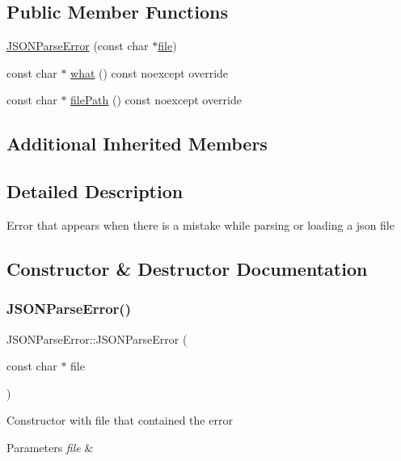 \subsection*{Public Member Functions}
\begin{DoxyCompactItemize}
\item 
\hyperlink{classJSONParseError_a92ab01ff5045faea98f10ed307b6306d}{J\+S\+O\+N\+Parse\+Error} (const char $\ast$\hyperlink{classFileError_a0ea1cc225bf7f8fa47aa0cfa0c2ba685}{file})
\item 
const char $\ast$ \hyperlink{classJSONParseError_a1f33b495974db21a050ede28eb0fe298}{what} () const noexcept override
\item 
const char $\ast$ \hyperlink{classJSONParseError_a24c5c1358b6ae6c96b30ebaa96e0a30b}{file\+Path} () const noexcept override
\end{DoxyCompactItemize}
\subsection*{Additional Inherited Members}


\subsection{Detailed Description}
Error that appears when there is a mistake while parsing or loading a json file 

\subsection{Constructor \& Destructor Documentation}
\mbox{\label{classJSONParseError_a92ab01ff5045faea98f10ed307b6306d}} 
\subsubsection{\texorpdfstring{J\+S\+O\+N\+Parse\+Error()}{JSONParseError()}}
{\footnotesize\ttfamily J\+S\+O\+N\+Parse\+Error\+::\+J\+S\+O\+N\+Parse\+Error (\begin{DoxyParamCaption}\item[{const char $\ast$}]{file }\end{DoxyParamCaption})}

Constructor with file that contained the error 
\begin{DoxyParams}{Parameters}
{\em file} & \\
\hline
\end{DoxyParams}


